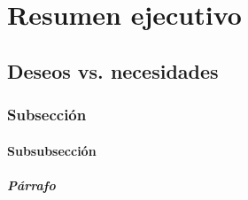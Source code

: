 \ifdefined\maindoc\else

\fi

\chapter{\textbf{Resumen} ejecutivo}
\blindtext

\section*{Deseos vs. \textbf{necesidades}}
\blindtext

\subsection*{Subsección}
\blindtext

\subsubsection*{Subsubsección}
\blindtext

\paragraph{Párrafo}
\blindtext



\ifdefined\maindoc\else

\fi